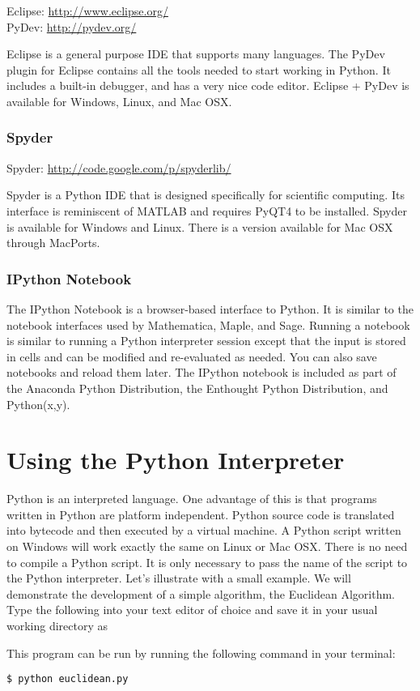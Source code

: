 Eclipse: \url{http://www.eclipse.org/} \\
PyDev: \url{http://pydev.org/}

Eclipse is a general purpose IDE that supports many languages.
The PyDev plugin for Eclipse contains all the tools needed to start working in Python.
It includes a built-in debugger, and has a very nice code editor.
Eclipse + PyDev is available for Windows, Linux, and Mac OSX.

\subsubsection*{Spyder}

Spyder: \url{http://code.google.com/p/spyderlib/}

Spyder is a Python IDE that is designed specifically for scientific computing.
Its interface is reminiscent of MATLAB and requires PyQT4 to be installed.
Spyder is available for Windows and Linux.
There is a version available for Mac OSX through MacPorts.

\subsubsection*{IPython Notebook}
The IPython Notebook is a browser-based interface to Python.
It is similar to the notebook interfaces used by Mathematica, Maple, and Sage.
Running a notebook is similar to running a Python interpreter session except that
the input is stored in cells and can be modified and re-evaluated as needed.
You can also save notebooks and reload them later.
The IPython notebook is included as part of the Anaconda Python Distribution, the
Enthought Python Distribution, and Python(x,y).


\section*{Using the Python Interpreter}
Python is an interpreted language.
One advantage of this is that programs written in Python are platform independent.
Python source code is translated into bytecode and then executed by a virtual machine.
A Python script written on Windows will work exactly the same on Linux or Mac OSX.
There is no need to compile a Python script.
It is only necessary to pass the name of the script to the Python interpreter.
Let's illustrate with a small example.
We will demonstrate the development of a simple algorithm, the Euclidean Algorithm.
Type the following into your text editor of choice and save it in your usual working directory as 

This program can be run by running the following command in your terminal:
\begin{lstlisting}
$ python euclidean.py
\end{lstlisting}

